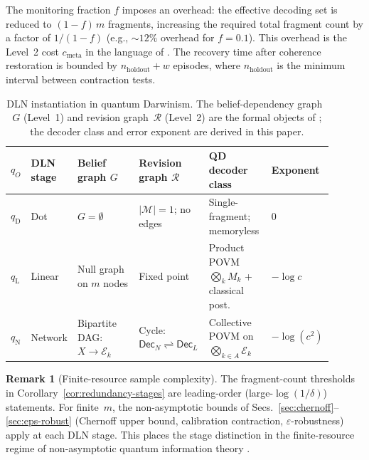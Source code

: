 \documentclass[11pt]{article}
\newcommand{\cE}{\mathcal{E}}
\newcommand{\1}{\mathbf{1}}
\theoremstyle{definition}
\newtheorem{remark}{Remark}
\theoremstyle{plain}
\begin{document}
\noindent
The monitoring fraction $f$ imposes an overhead: the effective decoding
set is reduced to $(1-f)\,m$ fragments, increasing the required total
fragment count by a factor of $1/(1-f)$ (e.g., ${\sim}12\%$ overhead
for $f=0.1$).
This overhead is the Level~2 cost
$c_{\mathrm{meta}}$ in the language of
\citep[Proposition~1]{WuDLNCompression2026preprint}.
The recovery time after coherence restoration is bounded by
$n_{\mathrm{holdout}}+w$ episodes, where $n_{\mathrm{holdout}}$ is the
minimum interval between contraction tests.


\begin{table}[t]
\caption{%
DLN instantiation in quantum Darwinism.
The belief-dependency graph~$G$ (Level~1) and revision
graph~$\mathcal{R}$ (Level~2) are the formal objects of
\citet{WuDLNCompression2026preprint};
the decoder class and error exponent are derived in this paper.
}
\label{tab:q-dln-mapping}
\centering
\small
\begin{tabular}{
  p{0.06\linewidth}
  p{0.10\linewidth}
  p{0.22\linewidth}
  p{0.22\linewidth}
  p{0.20\linewidth}
  p{0.10\linewidth}
}
\toprule
$q_O$ & DLN stage & Belief graph $G$
      & Revision graph $\mathcal{R}$
      & QD decoder class
      & Exponent \\
\midrule
$q_{\mathrm{D}}$ & Dot
  & $G=\emptyset$
  & $|\mathcal{M}|{=}1$; no edges
  & Single-fragment; memoryless
  & $0$ \\[3pt]
$q_{\mathrm{L}}$ & Linear
  & Null graph on $m$ nodes
  & Fixed point
  & Product POVM $\bigotimes_k M_k$ + classical post.
  & $-\log c$ \\[3pt]
$q_{\mathrm{N}}$ & Network
  & Bipartite DAG: $X\to\cE_k$
  & Cycle: $\mathsf{Dec}_N \rightleftharpoons \mathsf{Dec}_L$
  & Collective POVM on $\bigotimes_{k\in A}\cE_k$
  & $-\log(c^2)$ \\
\bottomrule
\end{tabular}
\end{table}


\begin{remark}[Finite-resource sample complexity]
\label{rem:finite-resource}
The fragment-count thresholds in
Corollary~\ref{cor:redundancy-stages} are leading-order
(large-$\log(1/\delta)$) statements.
For finite~$m$, the non-asymptotic bounds of
Secs.~\ref{sec:chernoff}--\ref{sec:eps-robust} (Chernoff upper bound,
calibration contraction, $\varepsilon$-robustness) apply at each DLN
stage.
This places the stage distinction in the finite-resource regime of
non-asymptotic quantum information theory
\citep{Tomamichel2016,AudenaertMosonyiVerstraete2012,
ChengDattaLiuNuradhaSalzmannWilde2025}.
\end{remark}
\end{document}
